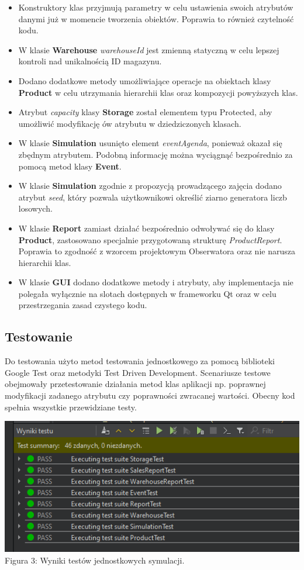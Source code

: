 \documentclass[11pt]{article}
\begin{document}
\begin{itemize}
    \item Konstruktory klas przyjmują parametry w celu ustawienia swoich atrybutów danymi już w momencie tworzenia obiektów. Poprawia to również czytelność kodu.
    \item W klasie \textbf{Warehouse} \textit{warehouseId} jest zmienną statyczną w celu lepszej kontroli nad unikalnością ID magazynu.
    \item Dodano dodatkowe metody umożliwiające operacje na obiektach klasy \textbf{Product} w celu utrzymania hierarchii klas oraz kompozycji powyższych klas.
    \item Atrybut \textit{capacity} klasy \textbf{Storage} został elementem typu Protected, aby umożliwić modyfikację ów atrybutu w dziedziczonych klasach.
    \item W klasie \textbf{Simulation} usunięto element \textit{eventAgenda}, ponieważ okazał się zbędnym atrybutem. Podobną informację można wyciągnąć bezpośrednio za pomocą metod klasy \textbf{Event}.
    \item W klasie \textbf{Simulation} zgodnie z propozycją prowadzącego zajęcia dodano atrybut \textit{seed}, który pozwala użytkownikowi określić ziarno generatora liczb losowych.
    \item W klasie \textbf{Report} zamiast działać bezpośrednio odwoływać się do klasy \textbf{Product}, zastosowano specjalnie przygotowaną strukturę \textit{ProductReport}. Poprawia to zgodność z wzorcem projektowym Obserwatora oraz nie narusza hierarchii klas.
    \item W klasie \textbf{GUI} dodano dodatkowe metody i atrybuty, aby implementacja nie polegała wyłącznie na slotach dostępnych w frameworku Qt oraz w celu przestrzegania zasad czystego kodu.
\end{itemize}

\subsection{Testowanie}
Do testowania użyto metod testowania jednostkowego za pomocą biblioteki Google Test oraz metodyki Test Driven Development. Scenariusze testowe obejmowały przetestowanie działania metod klas aplikacji np. poprawnej modyfikacji zadanego atrybutu czy poprawności zwracanej wartości. Obecny kod spełnia wszystkie przewidziane testy.

\begin{center}
    {\includegraphics[]{wyniki_testow.png}}\\
    Figura 3: Wyniki testów jednostkowych symulacji.
\end{center}
\end{document}
